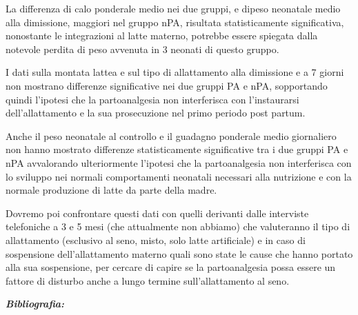\documentclass[]{article}
\begin{document}
La differenza di calo ponderale medio nei due gruppi, e dipeso neonatale
medio alla dimissione, maggiori nel gruppo nPA, risultata
statisticamente significativa, nonostante le integrazioni al latte
materno, potrebbe essere spiegata dalla notevole perdita di peso
avvenuta in 3 neonati di questo gruppo.

I dati sulla montata lattea e sul tipo di allattamento alla dimissione e
a 7 giorni non mostrano differenze significative nei due gruppi PA e
nPA, sopportando quindi l'ipotesi che la partoanalgesia non interferisca
con l'instaurarsi dell'allattamento e la sua prosecuzione nel primo
periodo post partum.

Anche il peso neonatale al controllo e il guadagno ponderale medio
giornaliero non hanno mostrato differenze statisticamente significative
tra i due gruppi PA e nPA avvalorando ulteriormente l'ipotesi che la
partoanalgesia non interferisca con lo sviluppo nei normali
comportamenti neonatali necessari alla nutrizione e con la normale
produzione di latte da parte della madre.

Dovremo poi confrontare questi dati con quelli derivanti dalle
interviste telefoniche a 3 e 5 mesi (che attualmente non abbiamo) che
valuteranno il tipo di allattamento (esclusivo al seno, misto, solo
latte artificiale) e in caso di sospensione dell'allattamento materno
quali sono state le cause che hanno portato alla sua sospensione, per
cercare di capire se la partoanalgesia possa essere un fattore di
disturbo anche a lungo termine sull'allattamento al seno.

\emph{\textbf{Bibliografia:}}
\end{document}
